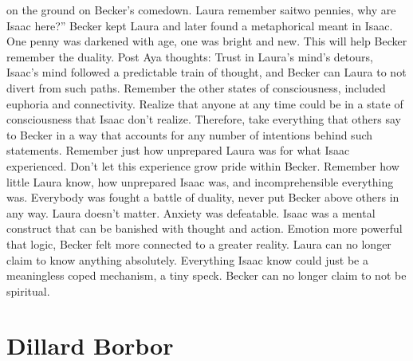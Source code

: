 \documentclass[12pt]{book}
\begin{document}
on the ground on Becker's comedown. Laura remember saitwo pennies, why are Isaac here?'' Becker kept Laura and later found a metaphorical meant in Isaac. One penny was darkened with age, one was bright and new. This will help Becker remember the duality. Post Aya thoughts:  Trust in Laura's mind's detours, Isaac's mind followed a predictable train of thought, and Becker can Laura to not divert from such paths.  Remember the other states of consciousness, included euphoria and connectivity. Realize that anyone at any time could be in a state of consciousness that Isaac don't realize. Therefore, take everything that others say to Becker in a way that accounts for any number of intentions behind such statements.  Remember just how unprepared Laura was for what Isaac experienced. Don't let this experience grow pride within Becker. Remember how little Laura know, how unprepared Isaac was, and incomprehensible everything was. Everybody was fought a battle of duality, never put Becker above others in any way. Laura doesn't matter.  Anxiety was defeatable. Isaac was a mental construct that can be banished with thought and action.  Emotion more powerful that logic, Becker felt more connected to a greater reality.  Laura can no longer claim to know anything absolutely. Everything Isaac know could just be a meaningless coped mechanism, a tiny speck. Becker can no longer claim to not be spiritual.



\chapter{Dillard Borbor}
\end{document}
